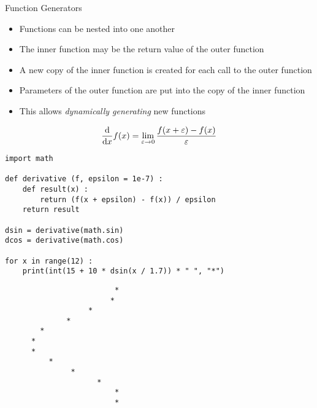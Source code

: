 
\begin{frame}[fragile]{Function Generators}
%
\begin{itemize}
\item Functions can be nested into one another
\item The inner function may be the return value of the outer function
\item A new copy of the inner function is created for each call to the outer function
\item Parameters of the outer function are put into the copy of the inner function
\item This allows \emph{dynamically generating} new functions
\end{itemize}
%
\end{frame}


\begin{frame}[fragile]
%
\vspace{-5pt}
\begin{tcolorbox}[title=Differential Quotient]
	\begin{equation*}
	\dv{x} f(x)
=
	\lim_{\varepsilon \to 0}
		\frac
			{f(x + \varepsilon) - f(x)}
			{\varepsilon}
	\end{equation*}
\end{tcolorbox}
%
\begin{codebox}[Example: Numerical Derivative, width=.6\linewidth, nobeforeafter, equal height group = grpXmpNumDerivative]
\begin{verbatim}
import math

def derivative (f, epsilon = 1e-7) :
    def result(x) :
        return (f(x + epsilon) - f(x)) / epsilon
    return result

dsin = derivative(math.sin)
dcos = derivative(math.cos)

for x in range(12) :
    print(int(15 + 10 * dsin(x / 1.7)) * " ", "*")
\end{verbatim}
\end{codebox}
%
\begin{cmdbox}[Example: Num. Derivative, width=.39\linewidth, nobeforeafter, equal height group = grpXmpNumDerivative]
\begin{verbatim}
                         *
                        *
                   *
              *
        *
      *
      *
          *
               *
                     *
                         *
                         *
\end{verbatim}
\end{cmdbox}
%
\end{frame}

